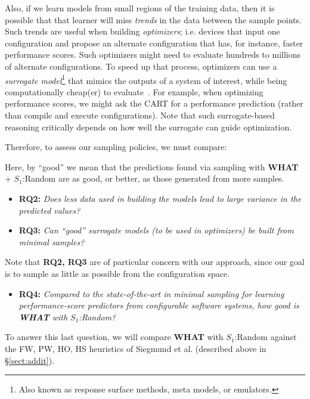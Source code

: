 \documentclass{sig-alternative}
\newcommand{\bi}{\begin{itemize}}%
\newcommand{\ei}{\end{itemize}}
\newcommand{\tion}[1]{\S\ref{sect:#1}}
\newcommand{\what}{{\bf WHAT }}
\begin{document}
Also, if we learn models from small regions of the training data,
then it is  possible that that learner will miss {\em trends} in the data
between the sample points. Such trends are useful when building {\em optimizers};
i.e. devices that input one configuration and propose an alternate
configuration that has, for instance, faster performance scores. Such optimizers might
need to evaluate hundreds to millions of alternate configurations. 
To speed up that process, optimizers can use a {\em surrogate model}\footnote{Also known as response surface methods, meta models, or emulators.}
that  mimics the outputs of a system of interest, while being computationally cheap(er) to evaluate~\cite{loshchilov13}. For example, when optimizing
performance scores, we might ask the CART  for a performance
prediction (rather than compile and execute
configurations).  Note that such surrogate-based
reasoning critically depends on how well the surrogate can guide optimization.


Therefore, to assess our sampling policies, we must compare:
Here, by ``good'' we mean that the predictions found via sampling with \what + $S_1$:Random are as good, or better,
as those generated from more samples.
\bi
\item {\bf RQ2:} {\em
Does less data used in building the models lead to large variance in the predicted values?}
\item {\bf RQ3:} {\em
Can ``good'' surrogate models (to be used in optimizers)
be built from minimal samples?}
\ei
Note that {\bf RQ2, RQ3} are of particular concern with our approach,
since our goal is to sample as little as possible from the configuration space.
\bi
\item {\bf RQ4:} {\em Compared to the state-of-the-art in minimal sampling for
learning performance-score predictors from configurable software systems, how good is \what with $S_1$:Random?}
\ei
To answer this last question, we will compare \what with $S_1$:Random
          against the FW, PW, HO, HS heuristics of Siegmund et al. (described above in \tion{addit}).
 
\end{document}
